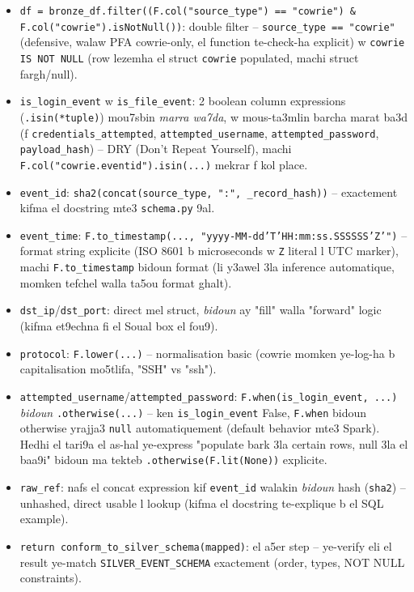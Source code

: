 \documentclass[11pt,a4paper]{report}
\DeclareRobustCommand{\code}[1]{\texttt{#1}}
\begin{document}
\begin{itemize}
  \item \code{df = bronze\_df.filter((F.col("source\_type") == "cowrie")
        \& F.col("cowrie").isNotNull())}: double filter -- \code{source\_type
        == "cowrie"} (defensive, walaw PFA cowrie-only, el function
        te-check-ha explicit) w \code{cowrie IS NOT NULL} (row lezemha
        el struct \code{cowrie} populated, machi struct fargh/null).
  \item \code{is\_login\_event} w \code{is\_file\_event}: 2 boolean column
        expressions (\code{.isin(*tuple)}) mou7sbin \emph{marra wa7da},
        w mous-ta3mlin barcha marat ba3d (f \code{credentials\_attempted},
        \code{attempted\_username}, \code{attempted\_password},
        \code{payload\_hash}) -- DRY (Don't Repeat Yourself), machi
        \code{F.col("cowrie.eventid").isin(...)} mekrar f kol place.
  \item \code{event\_id}: \code{sha2(concat(source\_type, ":", \_record\_hash))}
        -- exactement kifma el docstring mte3 \code{schema.py} 9al.
  \item \code{event\_time}: \code{F.to\_timestamp(..., "yyyy-MM-dd'T'HH:mm:ss.SSSSSS'Z'")}
        -- format string explicite (ISO 8601 b microseconds w \code{Z}
        literal l UTC marker), machi \code{F.to\_timestamp} bidoun format
        (li y3awel 3la inference automatique, momken tefchel walla ta5ou
        format ghalt).
  \item \code{dst\_ip}/\code{dst\_port}: direct mel struct, \emph{bidoun}
        ay "fill" walla "forward" logic (kifma et9echna fi el Soual box
        el fou9).
  \item \code{protocol}: \code{F.lower(...)} -- normalisation basic
        (cowrie momken ye-log-ha b capitalisation mo5tlifa, "SSH" vs
        "ssh").
  \item \code{attempted\_username}/\code{attempted\_password}: \code{F.when(is\_login\_event,
        ...)} \emph{bidoun} \code{.otherwise(...)} -- ken \code{is\_login\_event}
        False, \code{F.when} bidoun otherwise yrajja3 \code{null}
        automatiquement (default behavior mte3 Spark). Hedhi el tari9a
        el as-hal ye-express "populate bark 3la certain rows, null 3la
        el baa9i" bidoun ma tekteb \code{.otherwise(F.lit(None))} explicite.
  \item \code{raw\_ref}: nafs el concat expression kif \code{event\_id}
        walakin \emph{bidoun} hash (\code{sha2}) -- unhashed, direct
        usable l lookup (kifma el docstring te-explique b el SQL example).
  \item \code{return conform\_to\_silver\_schema(mapped)}: el a5er step
        -- ye-verify eli el result ye-match \code{SILVER\_EVENT\_SCHEMA}
        exactement (order, types, NOT NULL constraints).
\end{itemize}
\end{document}
